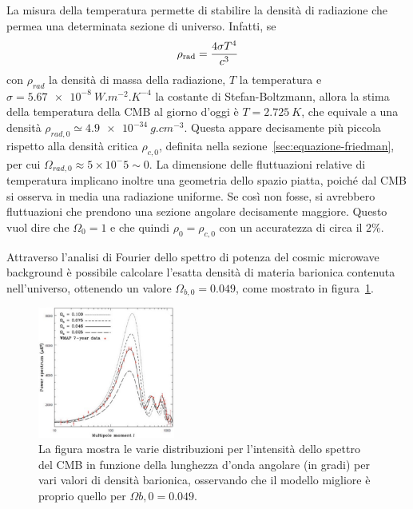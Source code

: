 La misura della temperatura permette di stabilire la densità di radiazione che permea una determinata sezione di universo. Infatti, se
\[
    \rho_\textup{rad} = \frac{4\sigma T^4}{c^3}
\]
con $\rho_{rad}$ la densità di massa della radiazione, $T$ la temperatura e $\sigma = \SI{5.67e-8}{W.m^{-2}.K^{-4}}$ la costante di Stefan-Boltzmann, allora la stima della temperatura della CMB al giorno d'oggi è $T=\SI{2.725}{K}$, che equivale a una densità $\rho_{rad, 0} \simeq \SI{4.9e-34}{g.cm^{-3}}$. Questa appare decisamente più piccola rispetto alla densità critica $\rho_{c,0}$, definita nella sezione~\ref{sec:equazione-friedman}, per cui $\Omega_{rad,0} \approx 5\times 10^-5 \sim 0$. La dimensione delle fluttuazioni relative di temperatura implicano inoltre una geometria dello spazio piatta, poiché dal CMB si osserva in media una radiazione uniforme. Se così non fosse, si avrebbero fluttuazioni che prendono una sezione angolare decisamente maggiore. Questo vuol dire che $\Omega_0 = 1$ e che quindi $\rho_0 = \rho_{c,0}$ con un accuratezza di circa il $2\%$.

Attraverso l'analisi di Fourier dello spettro di potenza del cosmic microwave background è possibile calcolare l'esatta densità di materia barionica contenuta nell'universo, ottenendo un valore $\Omega_{b,0} = 0.049$, come mostrato in figura~\ref{fig:baryon}.
\begin{figure}
    \centering
    \includegraphics[width=0.4\textwidth]{immagini/barioni.png}
    \caption{La figura mostra le varie distribuzioni per l'intensità dello spettro del CMB in funzione della lunghezza d'onda angolare (in gradi) per vari valori di densità barionica, osservando che il modello migliore è proprio quello per $\Omega{b,0} = 0.049$.}\label{fig:baryon}
\end{figure}

